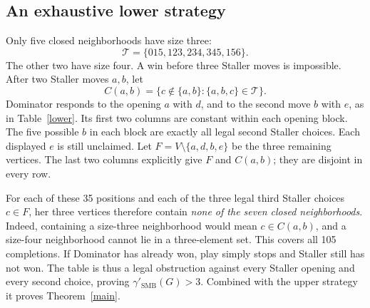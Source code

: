 \documentclass[11pt]{article}
\newcommand{\gs}{\gamma'_{\mathrm{SMB}}}
\begin{document}
\subsection{An exhaustive lower strategy}
Only five closed neighborhoods have size three:
\[
\mathcal T=\{015,123,234,345,156\}.
\]
The other two have size four. A win before three Staller moves is impossible. After two Staller moves $a,b$, let
\[
 C(a,b)=\{c\notin\{a,b\}:\{a,b,c\}\in\mathcal T\}.
\]
Dominator responds to the opening $a$ with $d$, and to the second move $b$ with $e$, as in Table~\ref{lower}. Its first two columns are constant within each opening block. The five possible $b$ in each block are exactly all legal second Staller choices. Each displayed $e$ is still unclaimed. Let $F=V\setminus\{a,d,b,e\}$ be the three remaining vertices. The last two columns explicitly give $F$ and $C(a,b)$; they are disjoint in every row.

For each of these 35 positions and each of the three legal third Staller choices $c\in F$, her three vertices therefore contain \emph{none of the seven closed neighborhoods}. Indeed, containing a size-three neighborhood would mean $c\in C(a,b)$, and a size-four neighborhood cannot lie in a three-element set. This covers all 105 completions. If Dominator has already won, play simply stops and Staller still has not won. The table is thus a legal obstruction against every Staller opening and every second choice, proving $\gs(G)>3$. Combined with the upper strategy it proves Theorem~\ref{main}.
\end{document}
